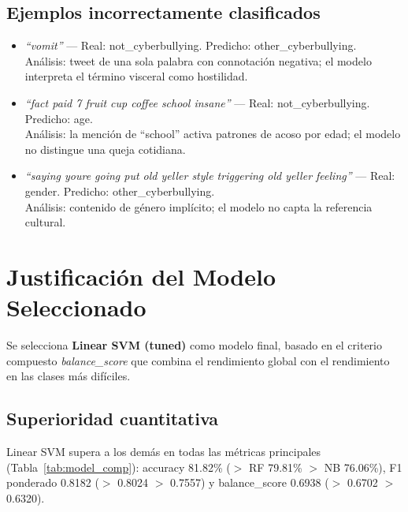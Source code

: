 ﻿\documentclass[12pt,a4paper]{article}
\begin{document}
\subsection{Ejemplos incorrectamente clasificados}
\begin{itemize}
  \item \textit{``vomit''} --- Real: not\_cyberbullying.
        Predicho: other\_cyberbullying.\\
        Análisis: tweet de una sola palabra con connotación negativa;
        el modelo interpreta el término visceral como hostilidad.
  \item \textit{``fact paid 7 fruit cup coffee school insane''} ---
        Real: not\_cyberbullying. Predicho: age.\\
        Análisis: la mención de ``school'' activa patrones de acoso
        por edad; el modelo no distingue una queja cotidiana.
  \item \textit{``saying youre going put old yeller style triggering
        old yeller feeling''} --- Real: gender.
        Predicho: other\_cyberbullying.\\
        Análisis: contenido de género implícito; el modelo no capta la
        referencia cultural.
\end{itemize}

\section{Justificación del Modelo Seleccionado}

Se selecciona \textbf{Linear SVM (tuned)} como modelo final, basado en
el criterio compuesto \textit{balance\_score} que combina el rendimiento
global con el rendimiento en las clases más difíciles.

\subsection{Superioridad cuantitativa}
Linear SVM supera a los demás en todas las métricas principales
(Tabla~\ref{tab:model_comp}): accuracy 81.82\% ($>$ RF 79.81\%
$>$ NB 76.06\%), F1 ponderado 0.8182 ($>$ 0.8024 $>$ 0.7557) y
balance\_score 0.6938 ($>$ 0.6702 $>$ 0.6320).
\end{document}
